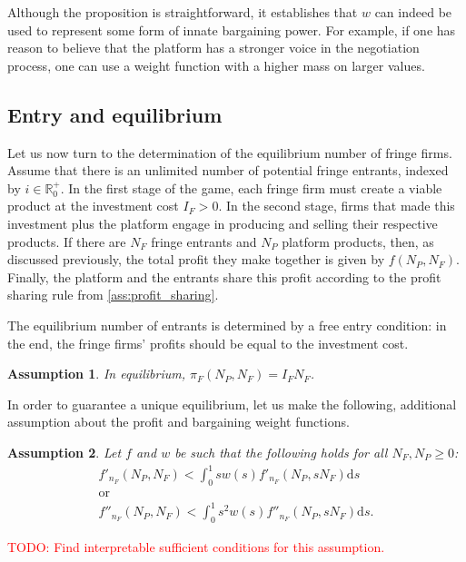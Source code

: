 \documentclass[a4paper]{article}
\newtheorem{assumption}{Assumption}
\newcommand{\ds}{\mathrm{d}s}
\begin{document}
Although the proposition is straightforward, it establishes that $w$ can indeed be used to represent some form of innate bargaining power.
For example, if one has reason to believe that the platform has a stronger voice in the negotiation process, one can use a weight function with a higher mass on larger values.


\subsection{Entry and equilibrium}

Let us now turn to the determination of the equilibrium number of fringe firms.
Assume that there is an unlimited number of potential fringe entrants, indexed by $i \in \mathbb{R}^+_0$.
In the first stage of the game, each fringe firm must create a viable product at the investment cost $I_F > 0$.
In the second stage, firms that made this investment plus the platform engage in producing and selling their respective products.
If there are $N_F$ fringe entrants and $N_P$ platform products, then, as discussed previously, the total profit they make together is given by $f(N_P, N_F)$.
Finally, the platform and the entrants share this profit according to the profit sharing rule from \cref{ass:profit_sharing}.

The equilibrium number of entrants is determined by a free entry condition: in the end, the fringe firms' profits should be equal to the investment cost.
\begin{assumption}
    \label{ass:free_entry}
    In equilibrium, $\pi_F(N_P, N_F) = I_F N_F$.
\end{assumption}

In order to guarantee a unique equilibrium, let us make the following, additional assumption about the profit and bargaining weight functions.
\begin{assumption}
    \label{ass:single_crossing}
    Let $f$ and $w$ be such that the following holds for all $N_F, N_P \geq 0$:
    \begin{gather*}
        f'_{n_F} (N_P, N_F) < \int_0^1 s w(s) f'_{n_F} (N_P, s N_F) \ds \\
        \text{or} \\
        f''_{n_F} (N_P, N_F) < \int_0^1 s^2 w(s) f''_{n_F} (N_P, s N_F) \ds.
    \end{gather*}
\end{assumption}
\textcolor{red}{TODO: Find interpretable sufficient conditions for this assumption.}
\end{document}
